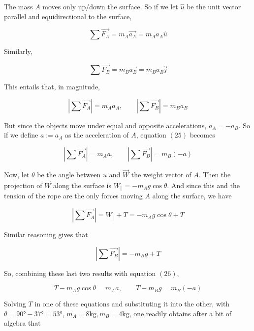 \documentclass[12pt]{article}
\theoremstyle{definition}
\begin{document}
The mass $A$ moves only up/down the surface. So if we let $\hat{u}$ be the unit
vector parallel and equidirectional to the surface, 

\begin{equation}
    \sum \vec{F_A} = m_A \vec{a_A} = m_A a_A \hat{u}
\end{equation}

Similarly, 

\begin{equation}
    \sum \vec{F_B} = m_B \vec{a_B} = m_B a_B \hat{j}
\end{equation}

This entails that, in magnitude, 

\begin{equation}
    \left| \sum \vec{F_A} \right|  = m_A a_A, \qquad \left| \sum \vec{F_B}
    \right| = m_B a_B
\end{equation}

But since the objects move under equal and opposite accelerations, $a_A = -a_B$.
So if we define $a := a_A$ as the acceleration of $A$, equation $(25)$ becomes 

\begin{equation}
    \left| \sum \vec{F_A} \right|  = m_A a, \qquad \left| \sum \vec{F_B}
    \right| = m_B (-a)
\end{equation}

Now, let $\theta$ be the angle between $\hat{u}$ and $\vec{W}$ the weight vector
of $A$. Then the projection of $\vec{W}$ along the surface is $W_{\parallel} =
-m_A g \cos \theta$. And since this and the tension of the rope are the only
forces moving $A$ along the surface, we have 

\begin{equation}
    \left|\sum \vec{F_A} \right| = W_{\parallel} + T = -m_A g \cos \theta + T
\end{equation}

Similar reasoning gives that 

\begin{equation}
    \left|\sum \vec{F_B}  \right| = -m_B g + T
\end{equation}

So, combining these last two results with equation $(26)$,

\begin{equation}
    T - m_A g \cos \theta = m_A a, \qquad T - m_B g = m_B (-a)
\end{equation}

Solving $T$ in one of these equations and substituting it into the other, with
$\theta = \ang{90} - \ang{37} = \ang{53}$, $m_A = 8\text{kg}, m_B = 4\text{kg}$,
one readily obtains after a bit of algebra that 
\end{document}
